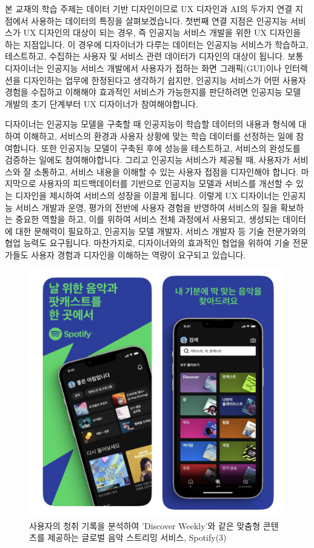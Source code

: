 \documentclass[
  letterpaper,
]{book}
\begin{document}
본 교재의 학습 주제는 데이터 기반 디자인이므로 UX 디자인과 AI의 두가지
연결 지점에서 사용하는 데이터의 특징을 살펴보겠습니다. 첫번째 연결
지점은 인공지능 서비스가 UX 디자인의 대상이 되는 경우, 즉 인공지능
서비스 개발을 위한 UX 디자인을 하는 지점입니다. 이 경우에 디자이너가
다루는 데이터는 인공지능 서비스가 학습하고, 테스트하고, 수집하는 사용자
및 서비스 관련 데이터가 디자인의 대상이 됩니다. 보통 디자이너는 인공지능
서비스 개발에서 사용자가 접하는 화면 그래픽(GUI)이나 인터렉션을
디자인하는 업무에 한정된다고 생각하기 쉽지만, 인공지능 서비스가 어떤
사용자 경험을 수집하고 이해해야 효과적인 서비스가 가능한지를 판단하려면
인공지능 모델 개발의 초기 단계부터 UX 디자이너가 참여해야합니다.

디자이너는 인공지능 모델을 구축할 때 인공지능이 학습할 데이터의 내용과
형식에 대하여 이해하고, 서비스의 환경과 사용자 상황에 맞는 학습 데이터를
선정하는 일에 참여합니다. 또한 인공지능 모델이 구축된 후에 성능을
테스트하고, 서비스의 완성도를 검증하는 일에도 참여해야합니다. 그리고
인공지능 서비스가 제공될 때, 사용자가 서비스와 잘 소통하고, 서비스
내용을 이해할 수 있는 사용자 접점을 디자인해야 합니다. 마지막으로
사용자의 피드백데이터를 기반으로 인공지능 모델과 서비스를 개선할 수 있는
디자인을 제시하여 서비스의 성장을 이끌게 됩니다. 이렇게 UX 디자이너는
인공지능 서비스 개발과 운영, 평가의 전반에 사용자 경험을 반영하여
서비스의 질을 확보하는 중요한 역할을 하고, 이를 위하여 서비스 전체
과정에서 사용되고, 생성되는 데이터에 대한 문해력이 필요하고, 인공지능
모델 개발자, 서비스 개발자 등 기술 전문가와의 협업 능력도 요구됩니다.
마찬가지로, 디자이너와의 효과적인 협업을 위하여 기술 전문가들도 사용자
경험과 디자인을 이해하는 역량이 요구되고 있습니다.

\begin{figure}[H]

{\centering \includegraphics{img/fig2.png}

}

\caption{사용자의 청취 기록을 분석하여 'Discover Weekly'와 같은 맞춤형
콘텐츠를 제공하는 글로벌 음악 스트리밍 서비스, Spotify(3)}

\end{figure}%
\end{document}
